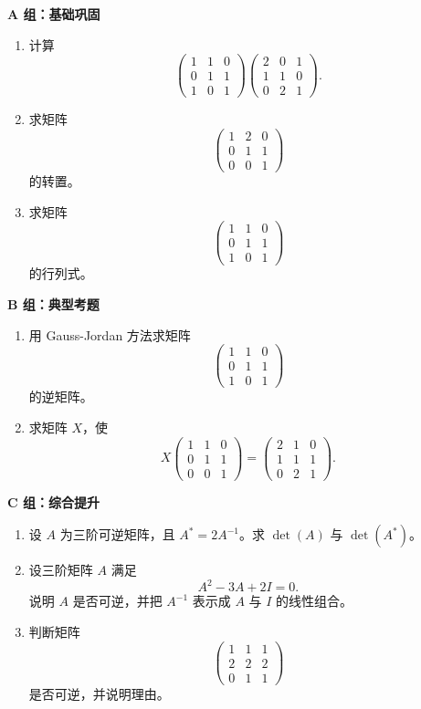 \documentclass[11pt,oneside,UTF8]{ctexbook}
\begin{document}
\begin{exercisebox}[第 2 章分级习题]
\textbf{A 组：基础巩固}
\begin{enumerate}[label=\textbf{A\arabic*.}]
  \item 计算
  \[
  \begin{pmatrix}
  1&1&0\\
  0&1&1\\
  1&0&1
  \end{pmatrix}
  \begin{pmatrix}
  2&0&1\\
  1&1&0\\
  0&2&1
  \end{pmatrix}.
  \]
  \item 求矩阵
  \[
  \begin{pmatrix}
  1&2&0\\
  0&1&1\\
  0&0&1
  \end{pmatrix}
  \]
  的转置。
  \item 求矩阵
  \[
  \begin{pmatrix}
  1&1&0\\
  0&1&1\\
  1&0&1
  \end{pmatrix}
  \]
  的行列式。
\end{enumerate}

\textbf{B 组：典型考题}
\begin{enumerate}[label=\textbf{B\arabic*.}]
  \item 用 Gauss-Jordan 方法求矩阵
  \[
  \begin{pmatrix}
  1&1&0\\
  0&1&1\\
  1&0&1
  \end{pmatrix}
  \]
  的逆矩阵。
  \item 求矩阵 \(X\)，使
  \[
  X\begin{pmatrix}
  1&1&0\\
  0&1&1\\
  0&0&1
  \end{pmatrix}
  =
  \begin{pmatrix}
  2&1&0\\
  1&1&1\\
  0&2&1
  \end{pmatrix}.
  \]
\end{enumerate}

\textbf{C 组：综合提升}
\begin{enumerate}[label=\textbf{C\arabic*.}]
  \item 设 \(A\) 为三阶可逆矩阵，且 \(A^*=2A^{-1}\)。求 \(\det(A)\) 与 \(\det(A^*)\)。
  \item 设三阶矩阵 \(A\) 满足
  \[
  A^2-3A+2I=0.
  \]
  说明 \(A\) 是否可逆，并把 \(A^{-1}\) 表示成 \(A\) 与 \(I\) 的线性组合。
  \item 判断矩阵
  \[
  \begin{pmatrix}
  1&1&1\\
  2&2&2\\
  0&1&1
  \end{pmatrix}
  \]
  是否可逆，并说明理由。
\end{enumerate}
\end{exercisebox}
\end{document}
